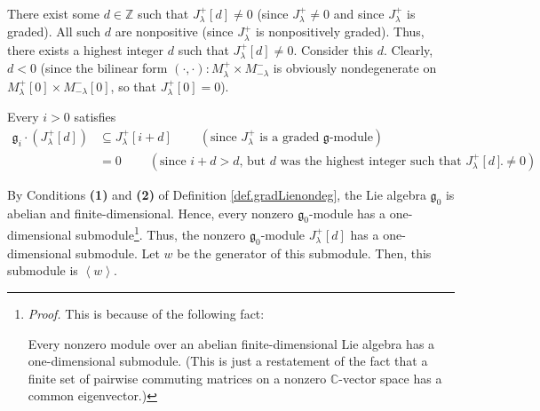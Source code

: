 \documentclass
[numbers=enddot,12pt,final,onecolumn,german,notitlepage]{scrartcl}%
\theoremstyle{definition}
\begin{document}
There exist some $d\in\mathbb{Z}$ such that $J_{\lambda}^{+}\left[  d\right]
\neq0$ (since $J_{\lambda}^{+}\neq0$ and since $J_{\lambda}^{+}$ is graded).
All such $d$ are nonpositive (since $J_{\lambda}^{+}$ is nonpositively
graded). Thus, there exists a highest integer $d$ such that $J_{\lambda}%
^{+}\left[  d\right]  \neq0$. Consider this $d$. Clearly, $d<0$ (since the
bilinear form $\left(  \cdot,\cdot\right)  :M_{\lambda}^{+}\times M_{-\lambda
}^{-}$ is obviously nondegenerate on $M_{\lambda}^{+}\left[  0\right]  \times
M_{-\lambda}^{-}\left[  0\right]  $, so that $J_{\lambda}^{+}\left[  0\right]
=0$).

Every $i>0$ satisfies
\begin{align*}
\mathfrak{g}_{i}\cdot\left(  J_{\lambda}^{+}\left[  d\right]  \right)   &
\subseteq J_{\lambda}^{+}\left[  i+d\right]  \ \ \ \ \ \ \ \ \ \ \left(
\text{since }J_{\lambda}^{+}\text{ is a graded }\mathfrak{g}\text{-module}%
\right) \\
&  =0\ \ \ \ \ \ \ \ \ \ \left(  \text{since }i+d>d\text{, but }d\text{ was
the highest integer such that }J_{\lambda}^{+}\left[  d\right]  \neq0\right)
.
\end{align*}


By Conditions \textbf{(1)} and \textbf{(2)} of Definition
\ref{def.gradLienondeg}, the Lie algebra $\mathfrak{g}_{0}$ is abelian and
finite-dimensional. Hence, every nonzero $\mathfrak{g}_{0}$-module has a
one-dimensional submodule\footnote{\textit{Proof.} This is because of the
following fact:
\par
Every nonzero module over an abelian finite-dimensional Lie algebra has a
one-dimensional submodule. (This is just a restatement of the fact that a
finite set of pairwise commuting matrices on a nonzero $\mathbb{C}$-vector
space has a common eigenvector.)}. Thus, the nonzero $\mathfrak{g}_{0}$-module
$J_{\lambda}^{+}\left[  d\right]  $ has a one-dimensional submodule. Let $w$
be the generator of this submodule. Then, this submodule is $\left\langle
w\right\rangle $.
\end{document}
